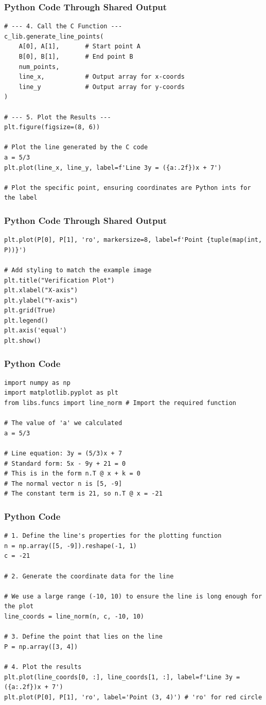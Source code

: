 \documentclass{beamer}
\begin{document}
\begin{frame}[fragile]
\frametitle{Python Code Through Shared Output}
\begin{lstlisting}
# --- 4. Call the C Function ---
c_lib.generate_line_points(
    A[0], A[1],       # Start point A
    B[0], B[1],       # End point B
    num_points,
    line_x,           # Output array for x-coords
    line_y            # Output array for y-coords
)

# --- 5. Plot the Results ---
plt.figure(figsize=(8, 6))

# Plot the line generated by the C code
a = 5/3
plt.plot(line_x, line_y, label=f'Line 3y = ({a:.2f})x + 7')

# Plot the specific point, ensuring coordinates are Python ints for the label
\end{lstlisting}    
\end{frame}
\begin{frame}[fragile]
\frametitle{Python Code Through Shared Output}
\begin{lstlisting}
plt.plot(P[0], P[1], 'ro', markersize=8, label=f'Point {tuple(map(int, P))}')

# Add styling to match the example image
plt.title("Verification Plot")
plt.xlabel("X-axis")
plt.ylabel("Y-axis")
plt.grid(True)
plt.legend()
plt.axis('equal')
plt.show()
\end{lstlisting}    
\end{frame}
\begin{frame}[fragile]
\frametitle{Python Code}
\begin{lstlisting}
import numpy as np
import matplotlib.pyplot as plt
from libs.funcs import line_norm # Import the required function

# The value of 'a' we calculated
a = 5/3

# Line equation: 3y = (5/3)x + 7
# Standard form: 5x - 9y + 21 = 0
# This is in the form n.T @ x + k = 0
# The normal vector n is [5, -9]
# The constant term is 21, so n.T @ x = -21
\end{lstlisting}    
\end{frame}
\begin{frame}[fragile]
\frametitle{Python Code}
\begin{lstlisting}
# 1. Define the line's properties for the plotting function
n = np.array([5, -9]).reshape(-1, 1)
c = -21

# 2. Generate the coordinate data for the line

# We use a large range (-10, 10) to ensure the line is long enough for the plot
line_coords = line_norm(n, c, -10, 10)

# 3. Define the point that lies on the line
P = np.array([3, 4])

# 4. Plot the results
plt.plot(line_coords[0, :], line_coords[1, :], label=f'Line 3y = ({a:.2f})x + 7')
plt.plot(P[0], P[1], 'ro', label='Point (3, 4)') # 'ro' for red circle
\end{lstlisting}    
\end{frame}
\end{document}
